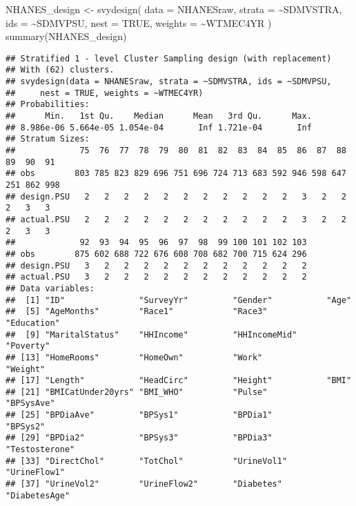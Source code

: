 \documentclass[
]{book}
\newenvironment{Shaded}{\begin{snugshade}}{\end{snugshade}}
\newcommand{\AttributeTok}[1]{\textcolor[rgb]{0.77,0.63,0.00}{#1}}
\newcommand{\ConstantTok}[1]{\textcolor[rgb]{0.00,0.00,0.00}{#1}}
\newcommand{\FunctionTok}[1]{\textcolor[rgb]{0.00,0.00,0.00}{#1}}
\newcommand{\NormalTok}[1]{#1}
\newcommand{\OtherTok}[1]{\textcolor[rgb]{0.56,0.35,0.01}{#1}}
\newcommand{\SpecialCharTok}[1]{\textcolor[rgb]{0.00,0.00,0.00}{#1}}
\theoremstyle{definition}
\theoremstyle{definition}
\theoremstyle{definition}
\theoremstyle{definition}
\theoremstyle{remark}
\begin{document}
\begin{Shaded}
\begin{Highlighting}[]
\NormalTok{NHANES\_design }\OtherTok{\textless{}{-}} \FunctionTok{svydesign}\NormalTok{(}
  \AttributeTok{data =}\NormalTok{ NHANESraw, }
  \AttributeTok{strata =} \SpecialCharTok{\textasciitilde{}}\NormalTok{SDMVSTRA, }
  \AttributeTok{ids =} \SpecialCharTok{\textasciitilde{}}\NormalTok{SDMVPSU, }
  \AttributeTok{nest =} \ConstantTok{TRUE}\NormalTok{, }
  \AttributeTok{weights =} \SpecialCharTok{\textasciitilde{}}\NormalTok{WTMEC4YR}
\NormalTok{)}
\FunctionTok{summary}\NormalTok{(NHANES\_design)}
\end{Highlighting}
\end{Shaded}

\begin{verbatim}
## Stratified 1 - level Cluster Sampling design (with replacement)
## With (62) clusters.
## svydesign(data = NHANESraw, strata = ~SDMVSTRA, ids = ~SDMVPSU, 
##     nest = TRUE, weights = ~WTMEC4YR)
## Probabilities:
##      Min.   1st Qu.    Median      Mean   3rd Qu.      Max. 
## 8.986e-06 5.664e-05 1.054e-04       Inf 1.721e-04       Inf 
## Stratum Sizes: 
##             75  76  77  78  79  80  81  82  83  84  85  86  87  88  89  90  91
## obs        803 785 823 829 696 751 696 724 713 683 592 946 598 647 251 862 998
## design.PSU   2   2   2   2   2   2   2   2   2   2   2   3   2   2   2   3   3
## actual.PSU   2   2   2   2   2   2   2   2   2   2   2   3   2   2   2   3   3
##             92  93  94  95  96  97  98  99 100 101 102 103
## obs        875 602 688 722 676 608 708 682 700 715 624 296
## design.PSU   3   2   2   2   2   2   2   2   2   2   2   2
## actual.PSU   3   2   2   2   2   2   2   2   2   2   2   2
## Data variables:
##  [1] "ID"               "SurveyYr"         "Gender"           "Age"             
##  [5] "AgeMonths"        "Race1"            "Race3"            "Education"       
##  [9] "MaritalStatus"    "HHIncome"         "HHIncomeMid"      "Poverty"         
## [13] "HomeRooms"        "HomeOwn"          "Work"             "Weight"          
## [17] "Length"           "HeadCirc"         "Height"           "BMI"             
## [21] "BMICatUnder20yrs" "BMI_WHO"          "Pulse"            "BPSysAve"        
## [25] "BPDiaAve"         "BPSys1"           "BPDia1"           "BPSys2"          
## [29] "BPDia2"           "BPSys3"           "BPDia3"           "Testosterone"    
## [33] "DirectChol"       "TotChol"          "UrineVol1"        "UrineFlow1"      
## [37] "UrineVol2"        "UrineFlow2"       "Diabetes"         "DiabetesAge"     

\end{verbatim}
\end{document}
